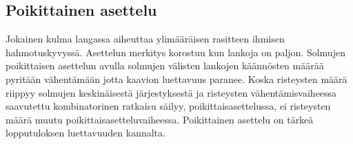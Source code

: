 \documentclass[finnish,12pt]{article}
\begin{document}

		\subsection{Poikittainen asettelu}

Jokainen kulma langassa aiheuttaa ylimääräisen rasitteen ihmisen hahmotuskyvyssä.
Asettelun merkitys korostuu kun lankoja on paljon.
Solmujen poikittaisen asettelun avulla solmujen välisten lankojen käännösten
määrää pyritään vähentämään jotta kaavion luettavuus paranee.
Koska risteysten määrä riippyy solmujen keskinäisestä järjestyksestä ja
risteysten vähentämisvaiheessa saavutettu kombinatorinen ratkaisu säilyy, poikittaisasettelussa,
ei risteysten määrä muutu poikittaisasetteluvaiheessa.
Poikittainen asettelu on tärkeä lopputuloksen luettavuuden kannalta.

\clearpage
{} %
 
\end{document}
